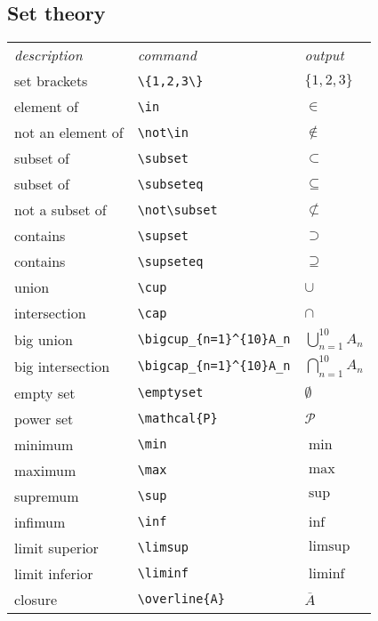 \begin{multicols}{3}
\subsection{Set theory}
\begin{tabular}{lll}
\emph{description} & \emph{command} & \emph{output}\\
set brackets & \verb!\{1,2,3\}! & $\{1,2,3\}$\\
element of & \verb!\in! & $\in$\\
not an element of & \verb!\not\in! & $\not\in$\\
subset of & \verb!\subset! & $\subset$\\
subset of & \verb!\subseteq! & $\subseteq$\\
not a subset of & \verb!\not\subset! & $\not\subset$\\
contains & \verb!\supset! & $\supset$\\
contains & \verb!\supseteq! & $\supseteq$\\
union & \verb!\cup! & $\cup$\\
intersection & \verb!\cap! & $\cap$\\
big union & 
\verb!\bigcup_{n=1}^{10}A_n! &
$\displaystyle \bigcup_{n=1}^{10}A_{n}$\\
big intersection & \verb!\bigcap_{n=1}^{10}A_n! &$\displaystyle \bigcap_{n=1}^{10}A_{n}$\\
empty set & \verb!\emptyset! & $\emptyset$\\
power set & \verb!\mathcal{P}! & $\mathcal{P}$\\
minimum & \verb!\min! & $\min$\\
maximum & \verb!\max! & $\max$\\
supremum & \verb!\sup! & $\sup$\\
infimum & \verb!\inf! & $\inf$\\
limit superior & \verb!\limsup! & $\limsup$\\
limit inferior & \verb!\liminf! & $\liminf$\\
closure & \verb!\overline{A}! & $\overline{A}$
\end{tabular}


\end{multicols}
